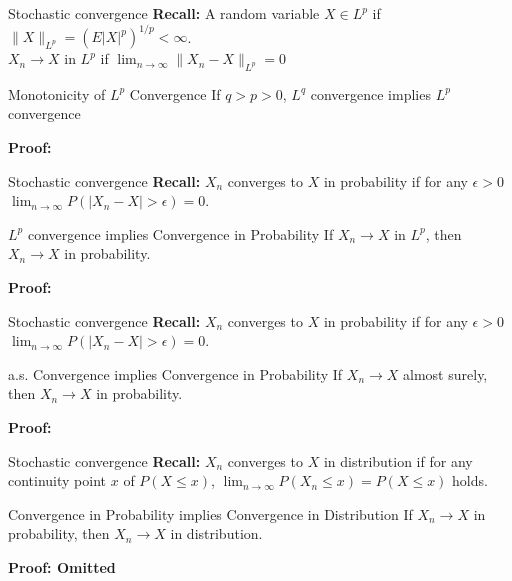 \documentclass [aspectratio=169]{beamer}
\begin{document}
\begin{frame}{Stochastic convergence}
    \textbf{Recall:} A random variable $X \in L^p$ if $\|X\|_{L^p} = (E |X|^p)^{1/p} < \infty$.\\ 
    \quad \qquad $X_n\to X$ in $L^p$ if $\lim_{n\to \infty}\|X_n - X\|_{L^p}=0$ \\
    \begin{block}{Monotonicity of $L^p$ Convergence}
    If $q>p>0$, $L^q$ convergence implies $L^p$ convergence 
    \end{block}
    \textbf{Proof: }
    \vspace{1.8in}
\end{frame}

\begin{frame}{Stochastic convergence}
    \textbf{Recall:} $X_n$ converges to $X$ in probability if for any $\epsilon>0$ $\lim_{n\to \infty}P(|X_n - X|>\epsilon)=0$.\\
    \begin{block}{$L^p$ convergence implies Convergence in Probability}
    If $X_n \to X$ in $L^p$, then $X_n \to X$ in probability. 
    \end{block}
    \textbf{Proof: }
    \vspace{1.8in}
\end{frame}

\begin{frame}{Stochastic convergence}
    \textbf{Recall:} $X_n$ converges to $X$ in probability if for any $\epsilon>0$ $\lim_{n\to \infty}P(|X_n - X|>\epsilon)=0$.\\
    \begin{block}{a.s. Convergence implies Convergence in Probability}
    If $X_n \to X$ almost surely, then $X_n \to X$ in probability. 
    \end{block}
    \textbf{Proof: }
    \vspace{1.8in}
\end{frame}

\begin{frame}{Stochastic convergence}
    \textbf{Recall:} $X_n$ converges to $X$ in distribution if for any continuity point $x$ of $P(X\leq x)$, $\lim_{n\to \infty}P(X_n \leq x) = P(X\leq x)$ holds.\\
    \begin{block}{Convergence in Probability implies Convergence in Distribution}
    If $X_n \to X$ in probability, then $X_n \to X$ in distribution. 
    \end{block}
    \textbf{Proof: Omitted}
    \vspace{1.8in}
\end{frame}
\end{document}
